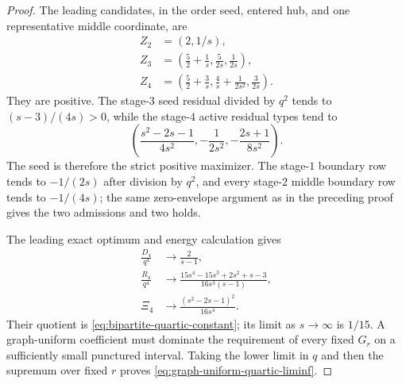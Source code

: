 \begin{proof}
The leading candidates, in the order seed, entered hub, and one representative
middle coordinate, are
\begin{align*}
 Z_2&=(2,1/s),\\
 Z_3&=\left(\frac52+\frac1s,\frac5{2s},\frac1{2s}\right),\\
 Z_4&=\left(\frac52+\frac3s,\frac4s+\frac1{2s^2},\frac3{2s}\right).
\end{align*}
They are positive.  The stage-$3$ seed residual divided by $q^2$ tends to
$(s-3)/(4s)>0$, while the stage-$4$ active residual types tend to
\begin{equation*}
 \left(\frac{s^2-2s-1}{4s^2},
       -\frac1{2s^2},
       -\frac{2s+1}{8s^2}\right).
\end{equation*}
The seed is therefore the strict positive maximizer.  The stage-$1$ boundary
row tends to $-1/(2s)$ after division by $q^2$, and every stage-$2$ middle
boundary row tends to $-1/(4s)$; the same zero-envelope argument as in the
preceding proof gives the two admissions and two holds.

The leading exact optimum and energy calculation gives
\begin{align*}
 \frac{D_4}{q^4}
 &\longrightarrow\frac2{s-1},\\
 \frac{R_4}{q^4}
 &\longrightarrow
 \frac{15s^4-15s^3+2s^2+s-3}{16s^3(s-1)},\\
 \Xi_4
 &\longrightarrow\frac{(s^2-2s-1)^2}{16s^4}.
\end{align*}
Their quotient is \cref{eq:bipartite-quartic-constant}; its limit as
$s\to\infty$ is $1/15$.  A graph-uniform coefficient must dominate the
requirement of every fixed $G_r$ on a sufficiently small punctured interval.
Taking the lower limit in $q$ and then the supremum over fixed $r$ proves
\cref{eq:graph-uniform-quartic-liminf}.
\end{proof}

